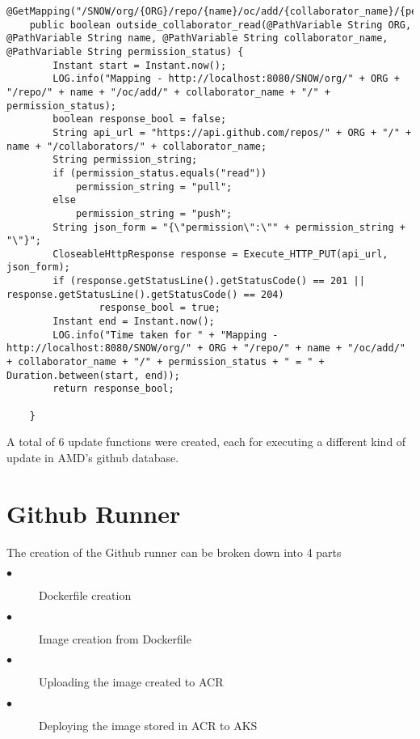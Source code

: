 \begin{lstlisting}[breaklines]
 @GetMapping("/SNOW/org/{ORG}/repo/{name}/oc/add/{collaborator_name}/{permission_status}")
    public boolean outside_collaborator_read(@PathVariable String ORG, @PathVariable String name, @PathVariable String collaborator_name, @PathVariable String permission_status) {
        Instant start = Instant.now();
        LOG.info("Mapping - http://localhost:8080/SNOW/org/" + ORG + "/repo/" + name + "/oc/add/" + collaborator_name + "/" + permission_status);
        boolean response_bool = false;
        String api_url = "https://api.github.com/repos/" + ORG + "/" + name + "/collaborators/" + collaborator_name;
        String permission_string;
        if (permission_status.equals("read"))
            permission_string = "pull";
        else 
            permission_string = "push";
        String json_form = "{\"permission\":\"" + permission_string + "\"}";
        CloseableHttpResponse response = Execute_HTTP_PUT(api_url, json_form);
        if (response.getStatusLine().getStatusCode() == 201 || response.getStatusLine().getStatusCode() == 204)
                response_bool = true;
        Instant end = Instant.now();
        LOG.info("Time taken for " + "Mapping - http://localhost:8080/SNOW/org/" + ORG + "/repo/" + name + "/oc/add/" + collaborator_name + "/" + permission_status + " = " + Duration.between(start, end));
        return response_bool;
        
    }
\end{lstlisting}

A total of 6 update functions were created, each for executing a different kind of update in AMD's github database.
\section{Github Runner}
The creation of the Github runner can be broken down into 4 parts
\begin{description}

\item[$\bullet$] Dockerfile creation

\item[$\bullet$] Image creation from Dockerfile

\item[$\bullet$] Uploading the image created to ACR

\item[$\bullet$] Deploying the image stored in ACR to AKS

\end{description}

